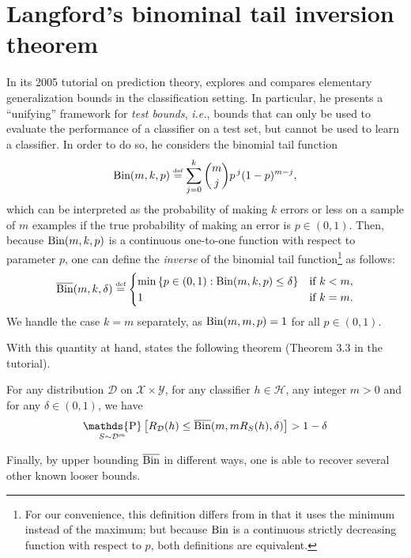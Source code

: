 \documentclass[twoside,11pt]{article}
\newcommand{\ie}{\emph{i.e.\xspace}}
\newcommand{\cb}[1]{\left\{#1\right\}}
\newcommand{\D}{\mathcal{D}}
\renewcommand{\H}{{\mathcal{H}}}
\newcommand{\X}{\mathcal{X}}
\newcommand{\Y}{\mathcal{Y}}
\newcommand{\eqdef}{\overset{\smash{\mbox{\tiny \rm def}}}{=}}
\DeclareMathOperator*{\Prob}{\mathds{P}}
\newcommand{\prob}[2]{\Prob_{#1}\left[#2\right]}
\newcommand{\Bin}{\textnormal{Bin}}
\newcommand{\BinInv}{\overline{\textnormal{Bin}}}
\begin{document}
\section{Langford's binominal tail inversion theorem}
\label{app:langfords_binomial_tail_inversion_theorem}

In its 2005 tutorial on prediction theory, \citeauthor{langford05} explores and compares elementary generalization bounds in the classification setting.
In particular, he presents a ``unifying'' framework for \emph{test bounds}, \ie, bounds that can only be used to evaluate the performance of a classifier on a test set, but cannot be used to learn a classifier.
In order to do so, he considers the binomial tail function
\begin{equation}
    \Bin(m, k, p) \eqdef \sum_{j=0}^{k} \binom{m}{j} {p}^{\,j} (1-p)^{m-j},
\end{equation}
which can be interpreted as the probability of making $k$ errors or less on a sample of $m$ examples if the true probability of making an error is $p \in (0,1)$.
Then, because $\Bin(m,k,p)$ is a continuous one-to-one function with respect to parameter $p$, one can define the \emph{inverse} of the binomial tail function\footnote{For our convenience, this definition differs from \cite{langford05} in that it uses the minimum instead of the maximum; but because $\Bin$ is a continuous strictly decreasing function with respect to $p$, both definitions are equivalent.} as follows:
\begin{equation}\label{def:bin_tail_inv}
    \BinInv(m, k, \delta) \eqdef
    \begin{cases}
        \min \cb{ p \in (0,1): \Bin(m,k,p) \le \delta } & \textnormal{if } k < m,\\
        1 & \textnormal{if } k=m.
    \end{cases}
\end{equation}
We handle the case $k=m$ separately, as $\Bin(m,m,p)=1$ for all $p\in (0,1)$.

With this quantity at hand, \citeauthor{langford05} states the following theorem (Theorem 3.3 in the tutorial).
\begin{theorem}\label{thm:bin_tail_inv}
For any distribution $\D$ on $\X \times \Y$, for any classifier $h\in\H$, any integer $m>0$ and for any $\delta\in(0,1)$, we have
\begin{equation}\label{eq:theorem_bintailinv}
    \prob{S\sim \D^m}{R_\D(h) \le \BinInv(m, m R_S(h), \delta)} > 1-\delta
\end{equation}
\end{theorem}
Finally, by upper bounding $\BinInv$ in different ways, one is able to recover several other known looser bounds.
\end{document}
